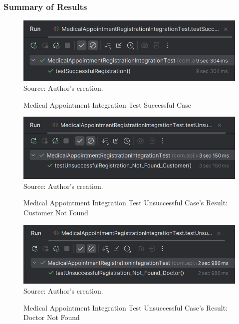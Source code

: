 \subsubsection{Summary of Results}

\begin{figure}[H]
	\centering
	\caption{Medical Appointment Integration Test Successful Case}
	\includegraphics[width=1\linewidth]{figures/medical_appointment_registration_integration_test_successful_result.png}
	\label{medical_appointment_registration_integration_test_successful_result}
	\footnotesize Source: Author's creation.
\end{figure}

\begin{figure}[H]
	\centering
	\caption{Medical Appointment Integration Test Unsuccessful Case's Result: Customer Not Found}
	\includegraphics[width=1\linewidth]{figures/medical_appointment_registration_integration_test_unsuccessful_result_customer_not_found.png}
	\label{medical_appointment_registration_integration_test_unsuccessful_result_customer_not_found}
	\footnotesize Source: Author's creation.
\end{figure}

\begin{figure}[H]
	\centering
	\caption{Medical Appointment Integration Test Unsuccessful Case's Result: Doctor Not Found}
	\includegraphics[width=1\linewidth]{figures/medical_appointment_registration_integration_test_unsuccessful_result_doctor_not_found.png}
	\label{medical_appointment_registration_integration_test_unsuccessful_result_doctor_not_found}
	\footnotesize Source: Author's creation.
\end{figure}

